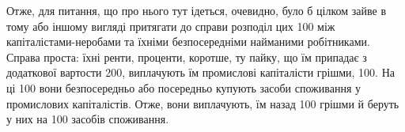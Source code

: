 Отже, для питання, що про нього тут ідеться, очевидно, було б цілком зайве в тому або іншому вигляді
притягати до справи розподіл цих 100 між капіталістами-неробами та їхніми безпосередніми
найманими робітниками. Справа проста: їхні ренти, проценти, коротше, ту пайку, що їм припадає з
додаткової вартости \deq{} 200, виплачують їм промислові капіталісти грішми, 100. На
ці 100 вони безпосередньо або посередньо купують засоби споживання у промислових
капіталістів. Отже, вони виплачують, їм назад 100 грішми й беруть у них на 100
засобів споживання.
